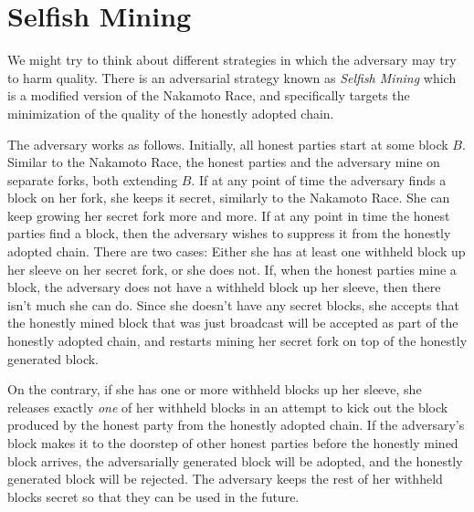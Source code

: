 \section{Selfish Mining}
We might try to think about different strategies in which the adversary may
try to harm quality. There is an adversarial strategy known as \emph{Selfish Mining}
which is a modified version of the Nakamoto Race, and specifically targets the minimization
of the quality of the honestly adopted chain.

The adversary works as follows. Initially, all honest parties start at some block $B$.
Similar to the Nakamoto Race, the honest parties and the adversary mine on separate forks,
both extending $B$. If at any point of time the adversary finds a block on her fork, she keeps
it secret, similarly to the Nakamoto Race. She can keep growing her secret fork more and more.
If at any point in time the honest parties find a block, then the adversary wishes to suppress
it from the honestly adopted chain. There are two cases: Either she has at least one withheld
block up her sleeve on her secret fork, or she does not. If, when the honest parties mine a block,
the adversary does not have a withheld block up her sleeve, then there isn't much she can do.
Since she doesn't have any secret blocks, she accepts that the honestly mined block that was
just broadcast will be accepted as part of the honestly adopted chain, and restarts mining
her secret fork on top of the honestly generated block.

On the contrary, if
she has one or more withheld blocks up her sleeve, she releases exactly \emph{one} of her
withheld blocks in an attempt
to kick out the block produced by the honest party from the honestly adopted chain. If
the adversary's block makes it to the doorstep of other honest parties before the honestly
mined block arrives, the adversarially generated block will be adopted, and the
honestly generated block will be rejected.
The adversary keeps the rest of her withheld blocks secret so that they can be used in the
future.

